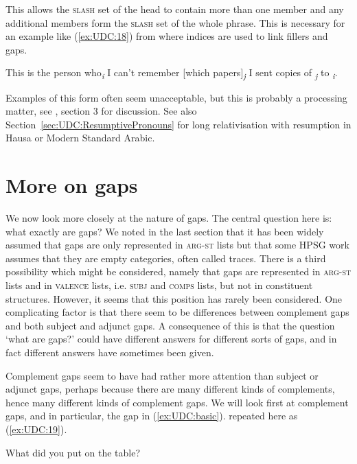 \documentclass[output=paper
                ,modfonts
                ,nonflat
	        ,collection
	        ,collectionchapter
	        ,collectiontoclongg
 	        ,biblatex
                ,babelshorthands
                ,newtxmath
                ,draftmode
                ,colorlinks, citecolor=brown
]{./langsci/langscibook}
\begin{document}
{\noindent
This allows the \textsc{slash} set of the head to contain more than one member
and any additional members form the \textsc{slash} set of the whole phrase. This
is necessary for an example like (\ref{ex:UDC:18}) from \citet{Chaves:12} where indices
are used to link fillers and gaps.

\begin{exe}
\ex \label{ex:UDC:18}
 This is the person who\emph{\textsubscript{i}} I can't remember
{[}which papers{]}\emph{\textsubscript{j}} I sent copies of \gap{}
\emph{\textsubscript{j}} to \gap{}\emph{\textsubscript{i}}.
\end{exe}

\noindent
Examples of this form often seem unacceptable, but this is probably a
processing matter,  see \citealp{Chaves:12}, section 3 for discussion.
See also Section~\ref{sec:UDC:ResumptivePronouns} for long relativisation with resumption in Hausa or Modern Standard Arabic. 

\section{More on gaps}
\label{sec:UDC:MoreOnGaps}


We now look more closely at the nature of gaps. The central question
here is: what exactly are gaps? We noted in the last section that it
has been widely assumed that gaps are only represented in
\textsc{arg-st} lists but that some HPSG work assumes that they are
empty categories, often called traces. There is a third possibility
which might be considered, namely that gaps are represented in
\textsc{arg-st} lists and in \textsc{valence} lists,
i.e. \textsc{subj} and \textsc{comps} lists, but not in constituent
structures. However, it seems that this position has rarely been
considered. One complicating factor is that there seem to be
differences between complement gaps and both subject and adjunct
gaps. A consequence of this is that the question `what are gaps?'
could have different answers for different sorts of gaps, and in fact
different answers have sometimes been given.

Complement gaps seem to have had rather more attention than subject or
adjunct gaps, perhaps because there are many different kinds of
complements, hence many different kinds of complement gaps. We will look
first at complement gaps, and in particular, the gap in (\ref{ex:UDC:basic}). repeated
here as (\ref{ex:UDC:19}).

\begin{exe}
\ex \label{ex:UDC:19}
What did you put \gap{} on the table?
\end{exe}

}
\end{document}
